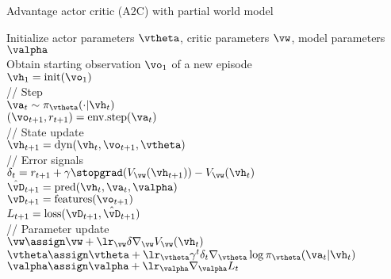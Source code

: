 \begin{algorithm}
\dontprintsemicolon
\caption{Advantage actor critic (A2C) with partial world model}
Initialize actor parameters $\vtheta$,
critic parameters $\vw$,
model parameters $\valpha$\\
       {
         Obtain starting observation $\vo_1$ of a new episode \\
             $\vh_1 = \text{init}(\vo_1)$ \\
           {
            // Step \\
      $\va_t \sim \pi_{\vtheta}(\cdot|\vh_t)$ \\
      $(\vo_{t+1}, r_{t+1}) = \text{env.step}(\va_t)$ \\

            // State update \\
       $\vh_{t+1} = \text{dyn}(\vh_{t}, \vo_{t+1}, \vtheta)$ \\
            
        // Error signals \\
        $\delta_t = r_{t+1} + \gamma \stopgrad(V_{\vw}(\vh_{t+1})) - V_{\vw}(\vh_t)$ \\
        $\hat{\vD}_{t+1}=        \text{pred}(\vh_t, \va_t, \valpha)$ \\
        $\vD_{t+1} = \text{features}(\vo_{t+1})$ \\
        $L_{t+1} = \text{loss}(\vD_{t+1}, \hat{\vD}_{t+1})$ \\
       
        // Parameter update \\
         $\vw  \assign \vw + \lr_{\vw} \delta \nabla_{\vw} V_{\vw}(\vh_t)$ \\
        $\vtheta \assign \vtheta +
        \lr_{\vtheta} \gamma^t \delta_t \nabla_{\vtheta} \log \pi_{\vtheta}(\va_t|\vh_t)$ \\
        $\valpha \assign \valpha + \lr_{\valpha}  \nabla_{\valpha} L_t$ \\
       }
}
\end{algorithm}


